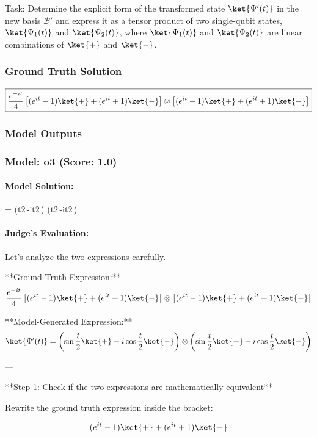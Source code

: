 \documentclass[10pt]{article}
\begin{document}
Task:
Determine the explicit form of the transformed state $\ket{\Psi'(t)}$ in the new basis $\mathcal{B}'$ and express it as a tensor product of two single-qubit states, $\ket{\Psi_1(t)}$ and $\ket{\Psi_2(t)}$, where $\ket{\Psi_1(t)}$ and $\ket{\Psi_2(t)}$ are linear combinations of $\ket{+}$ and $\ket{-}$.

\subsubsection*{Ground Truth Solution}
\[ \boxed{\frac{e^{-it}}{4} \left[ (e^{it}-1) \ket{+} + (e^{it}+1) \ket{-} \right] \otimes \left[ (e^{it}-1) \ket{+} + (e^{it}+1) \ket{-} \right]} \]

\subsubsection*{Model Outputs}
\subsubsection*{Model: o3 (Score: 1.0)}
\paragraph*{Model Solution:}
%
=
\bigl(\sin\tfrac t2\,\ket{+}-i\cos\tfrac t2\,\ket{-}\bigr)
\;\otimes\;
\bigl(\sin\tfrac t2\,\ket{+}-i\cos\tfrac t2\,\ket{-}\bigr)

\paragraph*{Judge's Evaluation:}

Let's analyze the two expressions carefully.

**Ground Truth Expression:**
\[
\frac{e^{-it}}{4} \left[ (e^{it}-1) \ket{+} + (e^{it}+1) \ket{-} \right] \otimes \left[ (e^{it}-1) \ket{+} + (e^{it}+1) \ket{-} \right]
\]

**Model-Generated Expression:**
\[
\ket{\Psi'(t)} = \left(\sin\frac{t}{2} \ket{+} - i \cos\frac{t}{2} \ket{-}\right) \otimes \left(\sin\frac{t}{2} \ket{+} - i \cos\frac{t}{2} \ket{-}\right)
\]

---

**Step 1: Check if the two expressions are mathematically equivalent**

Rewrite the ground truth expression inside the bracket:

\[
(e^{it} - 1) \ket{+} + (e^{it} + 1) \ket{-}
\]
\end{document}
